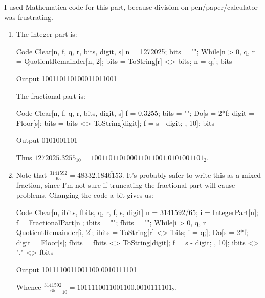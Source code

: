 \documentclass[11pt,twoside,openany]{memoir}
\begin{document}
        \begin{solution}
            I used Mathematica code for this part, because division on pen/paper/calculator was frustrating.
                \begin{enumerate}[label = (\arabic*),itemsep=1pt,topsep=3pt]
                    \item The integer part is:
\begin{mmaCell}[functionlocal=y]{Code}
Clear[n, f, q, r, bits, digit, s]
n = 1272025;
bits = "";
While[n > 0, {q, r} = QuotientRemainder[n, 2];
    bits = ToString[r] <> bits;
n = q;];
bits
\end{mmaCell}
\begin{mmaCell}{Output}
100110110100011011001
\end{mmaCell}
\newpage
                The fractional part is:
\begin{mmaCell}[functionlocal=y]{Code}
Clear[n, f, q, r, bits, digit, s]
f = 0.3255;
bits = "";
Do[s = 2*f;
    digit = Floor[s];
    bits = bits <> ToString[digit];
    f = s - digit; 
    , {10}];
bits
\end{mmaCell}
\begin{mmaCell}{Output}
0101001101
\end{mmaCell}
                Thus $1272025.3255_{10} = 100110110100011011001.0101001101_{2}$.

                \item Note that $\frac{3141592}{65} = 48332.1\overline{846153}$. It's probably safer to write this as a mixed fraction, since I'm not sure if truncating the fractional part will cause problems. Changing the code a bit gives us:
\begin{mmaCell}[functionlocal=y]{Code}
Clear[n, ibits, fbits, q, r, f, s, digit]
n = 3141592/65;
i = IntegerPart[n];
f = FractionalPart[n];
ibits = "";
fbits = "";
While[i > 0, 
    {q, r} = QuotientRemainder[i, 2];
    ibits = ToString[r] <> ibits;
    i = q;];
Do[s = 2*f;
    digit = Floor[s];
    fbits = fbits <> ToString[digit];
    f = s - digit;
    , {10}];
ibits <> "." <> fbits
\end{mmaCell}
\begin{mmaCell}{Output}
1011110011001100.0010111101
\end{mmaCell}
                    Whence $\frac{3141592}{65}_{10} = 1011110011001100.0010111101_2$.


\end{enumerate}
\end{solution}
\end{document}

